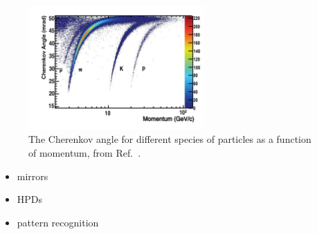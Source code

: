 \begin{figure}[!h]
    \centering
    \includegraphics[width=0.6\textwidth]{figs/Detector/rich_speices.pdf}
    \caption{The Cherenkov angle for different species of particles as a function of momentum, from Ref.~\cite{LHCb-DP-2012-003}.}
    \label{fig:Dec_rich_species}   
\end{figure}



{\color{Red}
\begin{itemize}
\item mirrors
\item HPDs
\item pattern recognition 
\end{itemize}
}



